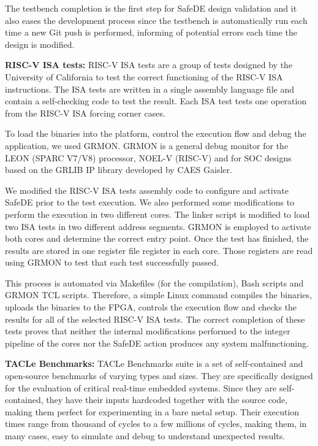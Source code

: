 The testbench completion is the first step for SafeDE design validation and it also eases the development process since the testbench is automatically run each time a new Git push is performed, informing of potential errors each time the design is modified.



\textbf{RISC-V ISA tests:} RISC-V ISA tests \cite{ISAtests} are a group of tests designed by the University of California to test the correct functioning of the RISC-V ISA instructions. The ISA tests are written in a single assembly language file and contain a self-checking code to test the result. Each ISA test tests one operation from the RISC-V ISA forcing corner cases. 

To load the binaries into the platform, control the execution flow and debug the application, we used GRMON. GRMON is a general debug monitor for the LEON (SPARC V7/V8) processor, NOEL-V (RISC-V) and for SOC designs based on the GRLIB IP library developed by CAES Gaisler. 

We modified the RISC-V ISA tests assembly code to configure and activate SafeDE prior to the test execution. We also performed some modifications to perform the execution in two different cores. The linker script is modified to load two ISA tests in two different address segments. GRMON is employed to activate both cores and determine the correct entry point. Once the test has finished, the results are stored in one register file register in each core. Those registers are read using GRMON to test that each test successfully passed. 

This process is automated via Makefiles (for the compilation), Bash scripts and GRMON TCL scripts. Therefore, a simple Linux command compiles the binaries, uploads the binaries to the FPGA, controls the execution flow and checks the results for all of the selected RISC-V ISA tests. The correct completion of these tests proves that neither the internal modifications performed to the integer pipeline of the cores nor the SafeDE action produces any system malfunctioning.

\textbf{TACLe Benchmarks:} TACLe Benchmarks suite \cite{falk2016taclebench} is a set of self-contained and open-source benchmarks of varying types and sizes. They are specifically designed for the evaluation of critical real-time embedded systems. Since they are self-contained, they have their inputs hardcoded together with the source code, making them perfect for experimenting in a bare metal setup. Their execution times range from thousand of cycles to a few millions of cycles, making them, in many cases, easy to simulate and debug to understand unexpected results.

